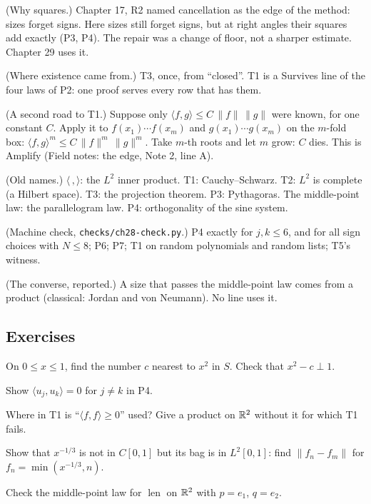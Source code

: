 \begin{lines}
\item[\lab{R1}] (Why squares.) Chapter 17, R2 named cancellation as the edge of the method: sizes forget signs. Here sizes still forget signs, but at right angles their squares add exactly (P3, P4). The repair was a change of floor, not a sharper estimate. Chapter 29 uses it.
\item[\lab{R2}] (Where existence came from.) T3, once, from ``closed''. T1 is a Survives line of the four laws of P2: one proof serves every row that has them.
\item[\lab{R3}] (A second road to T1.) Suppose only $\langle f, g \rangle \le C\,\|f\|\,\|g\|$ were known, for one constant $C$. Apply it to $f(x_1) \cdots f(x_m)$ and $g(x_1) \cdots g(x_m)$ on the $m$-fold box: $\langle f, g \rangle^m \le C\,\|f\|^m\,\|g\|^m$. Take $m$-th roots and let $m$ grow: $C$ dies. This is Amplify (Field notes: the edge, Note 2, line A).
\item[\lab{R4}] (Old names.) $\langle\,,\rangle$: the $L^2$ inner product. T1: Cauchy--Schwarz. T2: $L^2$ is complete (a Hilbert space). T3: the projection theorem. P3: Pythagoras. The middle-point law: the parallelogram law. P4: orthogonality of the sine system.
\item[\lab{R5}] (Machine check, \texttt{checks/ch28-check.py}.) P4 exactly for $j, k \le 6$, and for all sign choices with $N \le 8$; P6; P7; T1 on random polynomials and random lists; T5's witness.
\item[\lab{R6}] (The converse, reported.) A size that passes the middle-point law comes from a product (classical: Jordan and von Neumann). No line uses it.
\end{lines}

\subsection*{Exercises}

\begin{lines}
\item[\lab{E1}] On $0 \le x \le 1$, find the number $c$ nearest to $x^2$ in $S$. Check that $x^2 - c \perp 1$.
\item[\lab{E2}] Show $\langle u_j, u_k \rangle = 0$ for $j \neq k$ in P4.
\item[\lab{E3}] Where in T1 is ``$\langle f, f \rangle \ge 0$'' used? Give a product on $\mathbb{R}^2$ without it for which T1 fails.
\item[\lab{E4}] Show that $x^{-1/3}$ is not in $C[0,1]$ but its bag is in $L^2[0,1]$: find $\|f_n - f_m\|$ for $f_n = \min(x^{-1/3}, n)$.
\item[\lab{E5}] Check the middle-point law for $\operatorname{len}$ on $\mathbb{R}^2$ with $p = e_1$, $q = e_2$.
\end{lines}

